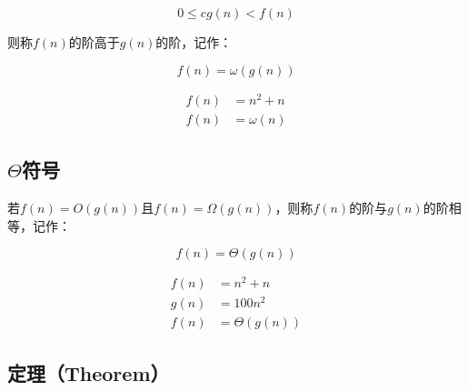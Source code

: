 \vspace{-0.5cm}

$$
    0 \le cg(n) < f(n)
$$

则称$ f(n) $的阶高于$ g(n) $的阶，记作：

\vspace{-0.5cm}

$$
    f(n) = \omega(g(n))
$$

\vspace{0.5cm}


\vspace{-0.5cm}

\begin{align*}
    f(n) & = n^2 + n   \\
    f(n) & = \omega(n)
\end{align*}

\subsection{$ \Theta $符号}

若$ f(n) = O(g(n)) $且$ f(n) = \Omega(g(n)) $，则称$ f(n) $的阶与$ g(n) $的阶相等，记作：

\vspace{-0.5cm}

$$
    f(n) = \Theta(g(n))
$$

\vspace{0.5cm}


\vspace{-0.5cm}

\begin{align*}
    f(n) & = n^2 + n      \\
    g(n) & = 100n^2       \\
    f(n) & = \Theta(g(n))
\end{align*}

\subsection{定理（Theorem）}

